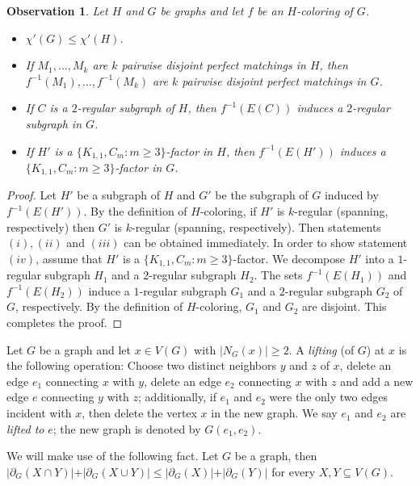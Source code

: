 \documentclass[a4paper,11pt]{article}
\newtheorem{obs}[defi]{Observation}
\theoremstyle{remark}
\begin{document}
\begin{obs}
	\label{obs:coloring_basics}
	Let $H$ and $G$ be graphs and let $f$ be an $H$-coloring of $G$.
	\begin{itemize}
		\item[(i)] $\chi'(G) \leq \chi'(H)$.
		\item[(ii)] If $M_1,\dots, M_k$ are $k$ pairwise disjoint perfect matchings in $H$, then $f^{-1}(M_1),\dots, f^{-1}(M_k)$ are $k$ pairwise disjoint perfect matchings in $G$.
		\item[(iii)] If $C$ is a $2$-regular subgraph of $H$, then $f^{-1}(E(C))$ induces a $2$-regular subgraph in $G$.
		\item[(iv)] If $ H' $ is a $ \{K_{1,1}, C_m\colon m\geq3\} $-factor in $H$, then $ f^{-1} (E(H'))$ induces a $ \{K_{1,1}, C_m\colon m\geq3\} $-factor in $ G $.
	\end{itemize}
\end{obs}
\begin{proof}
Let $ H' $ be a subgraph of $ H $ and $ G' $ be the subgraph of $ G $ induced by $f^{-1}(E(H'))$. 
By the definition of $ H $-coloring,  if $ H' $ is $ k $-regular (spanning, respectively) then $ G' $ is $ k $-regular (spanning, respectively). Then statements $ (i),(ii) $ and $ (iii) $ can be obtained immediately. 
In order to show statement $ (iv) $, assume that $ H' $ is a $ \{K_{1,1}, C_m\colon m\geq3\} $-factor.
We decompose $ H' $ into a $ 1 $-regular subgraph $ H_1 $ and a $ 2 $-regular subgraph $ H_2 $. The sets $ f^{-1} (E(H_1))$ and $ f^{-1} (E(H_2))$ induce a $ 1 $-regular subgraph $ G_1 $ and a $ 2 $-regular subgraph $ G_2 $ of $ G $, respectively. By the definition of $ H $-coloring, $ G_1 $ and $ G_2 $ are disjoint.
This completes the proof.
\end{proof}




Let $G$ be a graph and let $x \in V(G)$ with $ |N_G(x)|\geq2 $. A \emph{lifting} (of $G$) at $x$ is the following operation: Choose two distinct neighbors $y$ and $z$ of $x$, delete an edge $e_1$ connecting $x$ with $y$, delete an edge $e_2$ connecting $x$ with $z$ and add a new edge $e$ connecting $y$ with $z$; additionally, if $ e_1 $ and $ e_2 $ were the only two edges incident with $ x $, then delete the vertex $ x $ in the new graph. We say $e_1$ and $e_2$ are \emph{lifted to} $e$; the new graph is denoted by $G(e_1,e_2)$. 

We will make use of the following fact. Let $G$ be a graph, then 
$\vert \partial_G(X \cap Y) \vert + \vert \partial_G(X \cup Y) \vert \leq \vert \partial_G(X) \vert + \vert \partial_G(Y) \vert$ for every $X,Y \subseteq V(G)$.
\end{document}
